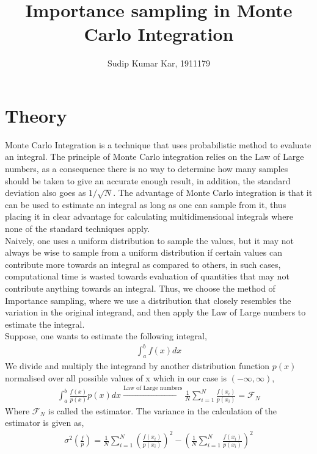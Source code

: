 \documentclass[a4paper,12pt]{article}
\begin{document}
\title{Importance sampling in Monte Carlo Integration}
\author{Sudip Kumar Kar, 1911179}
\date{}
    \maketitle
    \section*{Theory}
    Monte Carlo Integration is a technique that uses probabilistic method to evaluate an integral. The principle of Monte Carlo integration relies on the Law of Large numbers, as a consequence there is no way to determine how many samples should be taken to give an accurate enough result, in addition, the standard deviation also goes as $1/\sqrt{N}$. The advantage of Monte Carlo integration is that it can be used to estimate an integral as long as one can sample from it, thus placing it in clear advantage for calculating multidimensional integrals where none of the standard techniques apply.\\
    Naively, one uses a uniform distribution to sample the values, but it may not always be wise to sample from a uniform distribution if certain values can contribute more towards an integral as compared to others, in such cases, computational time is wasted towards evaluation of quantities that may not contribute anything towards an integral. Thus, we choose the method of Importance sampling, where we use a distribution that closely resembles the variation in the original integrand, and then apply the Law of Large numbers to estimate the integral.\\
    Suppose, one wants to estimate the following integral,
    \begin{gather}
        \int_a^b f(x)dx \label{eqn:Mint}
    \end{gather}
    We divide and multiply the integrand by another distribution function $p(x)$ normalised over all possible values of x which in our case is $(-\infty,\infty)$,
    \begin{gather}
        \int_a^b \frac{f(x)}{p(x)}p(x) dx \stackrel{\text{Law of Large numbers}}{\longrightarrow} \frac{1}{N}\sum_{i=1}^N\frac{f(x_i)}{p(x_i)}=\mathcal{F}_N
    \end{gather}
    Where $\mathcal{F}_N$ is called the estimator. The variance in the calculation of the estimator is given as,
    \begin{gather}
        \sigma^2\left(\frac{f}{p}\right)=\frac{1}{N}\sum_{i=1}^N \left(\frac{f(x_i)}{p(x_i)}\right)^2-\left(\frac{1}{N}\sum_{i=1}^N\frac{f(x_i)}{p(x_i)}\right)^2
    \end{gather}
\end{document}

